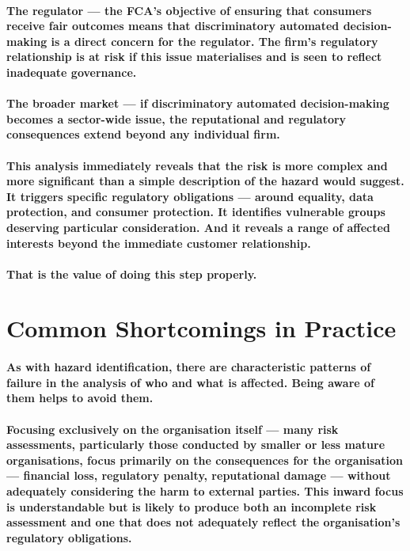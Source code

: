 \paragraph{\textbf{The regulator} — the FCA's objective of ensuring that consumers receive fair outcomes means that discriminatory automated decision-making is a direct concern for the regulator. The firm's regulatory relationship is at risk if this issue materialises and is seen to reflect inadequate governance.}
\paragraph{\textbf{The broader market} — if discriminatory automated decision-making becomes a sector-wide issue, the reputational and regulatory consequences extend beyond any individual firm.}
\paragraph{This analysis immediately reveals that the risk is more complex and more significant than a simple description of the hazard would suggest. It triggers specific regulatory obligations — around equality, data protection, and consumer protection. It identifies vulnerable groups deserving particular consideration. And it reveals a range of affected interests beyond the immediate customer relationship.}
\paragraph{That is the value of doing this step properly.}

\section{Common Shortcomings in Practice}
\paragraph{As with hazard identification, there are characteristic patterns of failure in the analysis of who and what is affected. Being aware of them helps to avoid them.}
\paragraph{\textbf{Focusing exclusively on the organisation itself} — many risk assessments, particularly those conducted by smaller or less mature organisations, focus primarily on the consequences for the organisation — financial loss, regulatory penalty, reputational damage — without adequately considering the harm to external parties. This inward focus is understandable but is likely to produce both an incomplete risk assessment and one that does not adequately reflect the organisation's regulatory obligations.}
